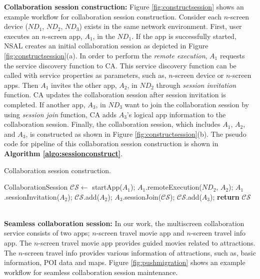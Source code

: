 \documentclass{sig-alternate}
\begin{document}
\noindent
\textbf{Collaboration session construction:}  Figure \ref{fig:constructsession} shows an example workflow for collaboration session construction. Consider each $n$-screen device ($ND_1$, $ND_2$, $ND_3$)  exists in the same network environment. 
First, user executes an $n$-screen app, $A_1$, in the $ND_1$. If the app is successfully started, NSAL creates an initial collaboration session as depicted in Figure \ref{fig:constructsession}(a). In order to perform the \textit{remote execution}, $A_1$ requests the service discovery function to CA.  This service discovery function can be called with service properties as parameters, such as, $n$-screen device or $n$-screen apps. Then $A_1$ invites the other app, $A_2$, in $ND_2$ through \textit{session invitation} function. CA updates the collaboration session after session invitation is completed. If another app, $A_3$, in $ND_3$ want to join the collaboration session by using \textit{session join} function, CA adds $A_3$'s logical app information to the collaboration session. Finally, the collaboration session, which includes $A_1$, $A_2$, and $A_3$, is constructed as shown in Figure \ref{fig:constructsession}(b). 
The pseudo code for pipeline of this collaboration session construction is shown in \textbf{Algorithm \ref{algo:sessionconstruct}}.
    \begin{algorithm}
    \caption{Collaboration session construction.}
    \label{algo:sessionconstruct}
    \begin{algorithmic}[1]
       \State CollaborationSession $\mathcal{CS} \gets$ startApp($A_1$);
       \State $A_1$.remoteExecution($ND_2$, $A_2$);
       \State $A_1$.sessionInvitation($A_2$);
       \State $\mathcal{CS}$.add($A_2$);
       \State $A_3$.sessionJoin($\mathcal{CS}$);
       \State $\mathcal{CS}$.add($A_3$);
       \State \textbf{return} $\mathcal{CS}$
    \EndProcedure
    \end{algorithmic}
    \end{algorithm}
\\

\noindent
\textbf{Seamless collaboration session:}  
In our work, the multiscreen collaboration service consists of two apps; $n$-screen travel movie app and $n$-screen travel info app. 
The $n$-screen travel movie app provides guided movies related to attractions. 
The $n$-screen travel info provides various information of attractions, such as, basic information, POI data and maps.
Figure \ref{fig:pushmigration} shows an example workflow for seamless collaboration session maintenance. 
\end{document}

